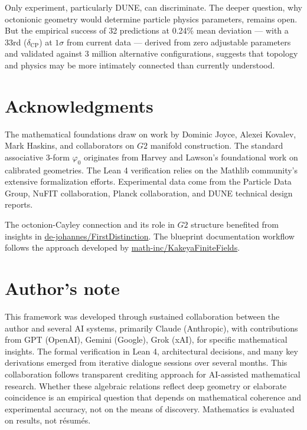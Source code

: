 \documentclass[11pt,a4paper]{article}
\newcommand{\Gtwo}{\mathrm{G}_2}
\def\Gtwo{G2}%
\begin{document}
Only experiment, particularly DUNE, can discriminate. The deeper question, why octonionic geometry would determine particle physics parameters, remains open. But the empirical success of 32 predictions at 0.24\% mean deviation --- with a 33rd ($\delta_{\mathrm{CP}}$) at $1\sigma$ from current data --- derived from zero adjustable parameters and validated against 3 million alternative configurations, suggests that topology and physics may be more intimately connected than currently understood.

\vfill

\section*{Acknowledgments}

The mathematical foundations draw on work by Dominic Joyce, Alexei Kovalev, Mark Haskins, and collaborators on $\Gtwo$ manifold construction. The standard associative 3-form $\varphi_0$ originates from Harvey and Lawson's foundational work on calibrated geometries. The Lean 4 verification relies on the Mathlib community's extensive formalization efforts. Experimental data come from the Particle Data Group, NuFIT collaboration, Planck collaboration, and DUNE technical design reports.

{\sloppy The octonion-Cayley connection and its role in $\Gtwo$ structure benefited from insights in \href{https://github.com/de-johannes/FirstDistinction}{de-johannes/FirstDistinction}. The blueprint documentation workflow follows the approach developed by \href{https://github.com/math-inc/KakeyaFiniteFields}{math-inc/KakeyaFiniteFields}.\par}

\section*{Author's note}

This framework was developed through sustained collaboration between the author and several AI systems, primarily Claude (Anthropic), with contributions from GPT (OpenAI), Gemini (Google), Grok (xAI), for specific mathematical insights. The formal verification in Lean 4, architectural decisions, and many key derivations emerged from iterative dialogue sessions over several months. This collaboration follows transparent crediting approach for AI-assisted mathematical research. Whether these algebraic relations reflect deep geometry or elaborate coincidence is an empirical question that depends on mathematical coherence and experimental accuracy, not on the means of discovery. Mathematics is evaluated on results, not r\'esum\'es.
\end{document}
